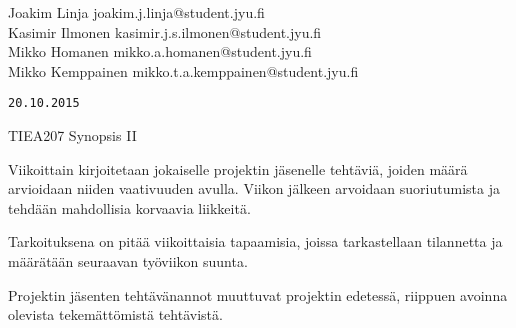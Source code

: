 \documentclass[a4paper, twoside, finnish, english, 12pt]{article}
\title{}
\author{Joakim Linja}
\begin{document}
\setlength{\parindent}{0pt} %
\setlength{\parskip}{4mm} %
\onehalfspacing
\newcommand{\pound}{\operatornamewithlimits{\#}}
\newcommand{\lA}{\left\langle}
\newcommand{\rA}{\right\rangle}
\newcommand{\lI}{\left|}
\newcommand{\rI}{\right|}
\newcommand{\Unit}[1]{\ \unit{#1}}
\newcommand{\Var}[2]{$#1\ \unit{#2}$}
\newcommand{\Varf}[3]{$#1\ \frac{\unit{#2}}{\unit{#3}}$}
\newcommand{\Eqen}{\text{.}}
\newcommand{\todoi}[1]{\todo[inline]{#1}}
\newcommand{\cluster}[2]{$\text{#1}_{#2}$}
\newcommand{\vuosi}{2014}
\newcommand{\question}[1]{\subsection*{Question {#1} solution}}
\newcommand{\labwork}[1]{\newpage \section{#1}}
\newcommand{\E}[1]{\cdot 10^{#1}}
\newcommand{\Et}[1]{\ \text{x}10^{#1}}
\newcommand{\EUnit}[2]{\E{#1}\Unit{#2}}
\newcommand{\FUnit}[2]{\ \frac{\unit{#1}}{\unit{#2}}}
\newcommand{\EFUnit}[3]{\E{#1}\frac{\unit{#2}}{\unit{#3}}}
\newcommand{\upd}{\text{d}}


\begin{flushleft}
Joakim Linja
\hfill 
\textsf{joakim.j.linja@student.jyu.fi}\hfill
\\ Kasimir Ilmonen\hfill
\textsf{kasimir.j.s.ilmonen@student.jyu.fi}\hfill
\\ Mikko Homanen\hfill
\textsf{mikko.a.homanen@student.jyu.fi}\hfill
\\ Mikko Kemppainen\hfill
\textsf{mikko.t.a.kemppainen@student.jyu.fi}\hfill

\hfill \texttt{20.10.2015}
\end{flushleft}
\setcounter{page}{1}

\begin{center}
\huge
{TIEA207 Synopsis II}
\end{center}


Viikoittain kirjoitetaan jokaiselle projektin jäsenelle tehtäviä, joiden määrä arvioidaan niiden vaativuuden avulla. 
Viikon jälkeen arvoidaan suoriutumista ja tehdään mahdollisia korvaavia liikkeitä. 

Tarkoituksena on pitää viikoittaisia tapaamisia, joissa tarkastellaan tilannetta ja määrätään seuraavan työviikon suunta. 

Projektin jäsenten tehtävänannot muuttuvat projektin edetessä, riippuen avoinna olevista tekemättömistä tehtävistä. 


%
\end{document}
